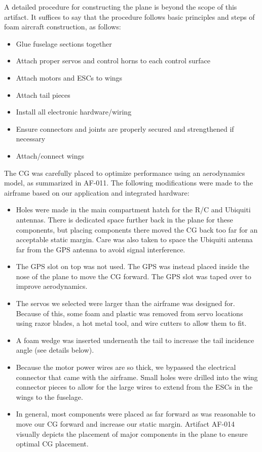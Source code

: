 \documentclass[]{auvsi_doc}
\begin{document}
A detailed procedure for constructing the plane is beyond the scope of this artifact. It suffices to say that the procedure follows basic principles and steps of foam aircraft construction, as follows:

\begin{itemize}
	\item Glue fuselage sections together
	\item Attach proper servos and control horns to each control surface
	\item Attach motors and ESCs to wings
	\item Attach tail pieces
	\item Install all electronic hardware/wiring
	\item Ensure connectors and joints are properly secured and strengthened if necessary
	\item Attach/connect wings
\end{itemize}

The CG was carefully placed to optimize performance using an aerodynamics model, as summarized in AF-011. The following modifications were made to the airframe based on our application and integrated hardware:

\begin{itemize}
	\item Holes were made in the main compartment hatch for the R/C and Ubiquiti antennas. There is dedicated space further back in the plane for these components, but placing components there moved the CG back too far for an acceptable static margin. Care was also taken to space the Ubiquiti antenna far from the GPS antenna to avoid signal interference.
	\item The GPS slot on top was not used. The GPS was instead placed inside the nose of the plane to move the CG forward. The GPS slot was taped over to improve aerodynamics.
	\item The servos we selected were larger than the airframe was designed for. Because of this, some foam and plastic was removed from servo locations using razor blades, a hot metal tool, and wire cutters to allow them to fit.
	\item A foam wedge was inserted underneath the tail to increase the tail incidence angle (see  details below).
	\item Because the motor power wires are so thick, we bypassed the electrical connector that came with the airframe. Small holes were drilled into the wing connector pieces to allow for the large wires to extend from the ESCs in the wings to the fuselage.
	\item In general, most components were placed as far forward as was reasonable to move our CG forward and increase our static margin. Artifact AF-014 visually depicts the placement of major components in the plane to ensure optimal CG placement. 
\end{itemize}
\end{document}
